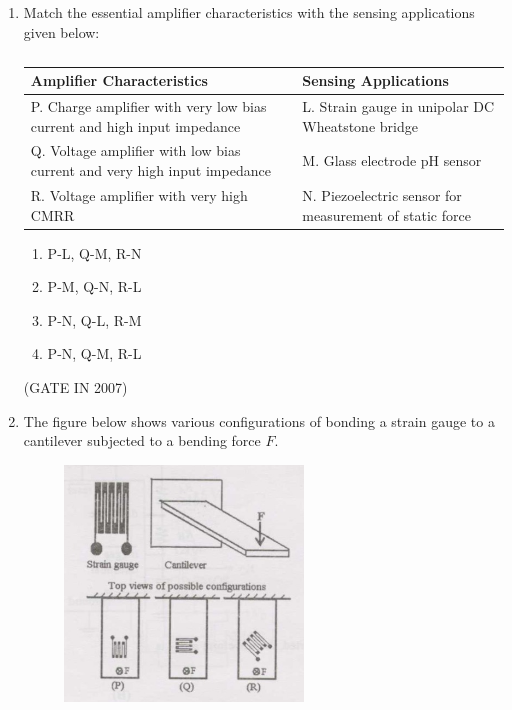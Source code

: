 \documentclass[journal]{IEEEtran}
\begin{document}
\begin{enumerate}
\item Match the essential amplifier characteristics with the sensing applications given below: \\
\begin{table}[H]
\centering
\begin{tabular}{p{4cm} p{4cm}}
\textbf{Amplifier Characteristics} & \textbf{Sensing Applications} \\
\hline
P. Charge amplifier with very low bias current and high input impedance & L. Strain gauge in unipolar DC Wheatstone bridge \\
Q. Voltage amplifier with low bias current and very high input impedance & M. Glass electrode pH sensor \\
R. Voltage amplifier with very high CMRR & N. Piezoelectric sensor for measurement of static force \\
\end{tabular}
\caption{}
\label{tab:matching 1}
\end{table}
\begin{multicols}{2}
\begin{enumerate}
\item P-L, Q-M, R-N
\item P-M, Q-N, R-L
\item P-N, Q-L, R-M
\item P-N, Q-M, R-L
\end{enumerate}
\end{multicols}
\hfill(GATE IN 2007)
\item The figure below shows various configurations of bonding a strain gauge to a cantilever subjected to a bending force $F$.  
\begin{figure}[H]
    \centering
      \includegraphics[width=0.6\textwidth]{2.jpg} 
      \caption{}
    \label{fig:fig2} 

\end{figure}
\end{enumerate}
\end{document}
